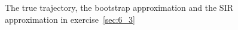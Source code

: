 \documentclass[a4paper,oneside,article]{memoir}
\begin{document}
\begin{figure}[htb]
  \begin{adjustwidth}{-2in}{-2in}
	  \centering
  \end{adjustwidth}
  	  \caption{The true trajectory, the bootstrap approximation and the SIR approximation in exercise~\ref{sec:6_3}}
	  \label{fig:ex_6_3}
\end{figure}


\begin{table}[h]
	\centering
	
	\label{table:rmse6_3}
\end{table}
\end{document}
